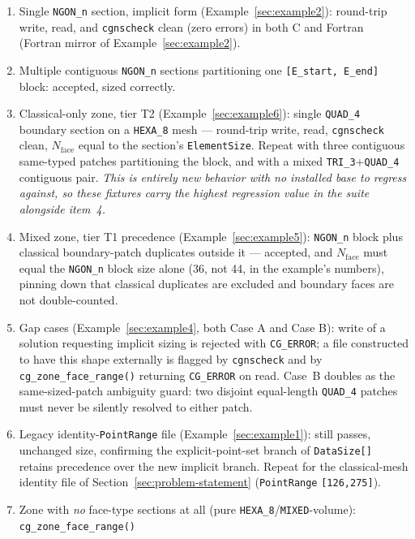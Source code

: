 \documentclass[11pt,letterpaper]{article}
\begin{document}
\begin{enumerate}[leftmargin=2em]
\item Single \texttt{NGON\_n} section, implicit form
  (Example~\ref{sec:example2}): round-trip write, read, and
  \texttt{cgnscheck} clean (zero errors) in both C and Fortran (Fortran
  mirror of Example~\ref{sec:example2}).
\item Multiple contiguous \texttt{NGON\_n} sections partitioning one
  \texttt{[E\_start, E\_end]} block: accepted, sized correctly.
\item Classical-only zone, tier T2 (Example~\ref{sec:example6}): single
  \texttt{QUAD\_4} boundary section on a \texttt{HEXA\_8} mesh ---
  round-trip write, read, \texttt{cgnscheck} clean, $N_{\mathrm{face}}$
  equal to the section's \texttt{ElementSize}. Repeat with three
  contiguous same-typed patches partitioning the block, and with a
  mixed \texttt{TRI\_3}+\texttt{QUAD\_4} contiguous pair. \emph{This is
  entirely new behavior with no installed base to regress against, so
  these fixtures carry the highest regression value in the suite
  alongside item~4.}
\item Mixed zone, tier T1 precedence (Example~\ref{sec:example5}):
  \texttt{NGON\_n} block plus classical boundary-patch duplicates
  outside it --- accepted, and $N_{\mathrm{face}}$ must equal the
  \texttt{NGON\_n} block size alone (36, not 44, in the example's
  numbers), pinning down that classical duplicates are excluded and
  boundary faces are not double-counted.
\item Gap cases (Example~\ref{sec:example4}, both Case A and Case B):
  write of a solution requesting implicit sizing is rejected with
  \texttt{CG\_ERROR}; a file constructed to have this shape externally
  is flagged by \texttt{cgnscheck} and by
  \texttt{cg\_zone\_face\_range()} returning \texttt{CG\_ERROR} on read.
  Case~B doubles as the same-sized-patch ambiguity guard: two disjoint
  equal-length \texttt{QUAD\_4} patches must never be silently resolved
  to either patch.
\item Legacy identity-\texttt{PointRange} file
  (Example~\ref{sec:example1}): still passes, unchanged size, confirming
  the explicit-point-set branch of \texttt{DataSize[]} retains precedence
  over the new implicit branch. Repeat for the classical-mesh identity
  file of Section~\ref{sec:problem-statement} (\texttt{PointRange}
  \texttt{[126,275]}).
\item Zone with \emph{no} face-type sections at all (pure
  \texttt{HEXA\_8}/\texttt{MIXED}-volume): \texttt{cg\_zone\_face\_range()}

\end{enumerate}
\end{document}
